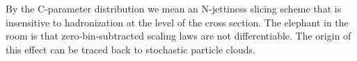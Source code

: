 By the C-parameter distribution we mean an N-jettiness slicing scheme
that is insensitive to hadronization at the level of the cross section.
The elephant in the room is that zero-bin-subtracted scaling laws are
not differentiable. The origin of this effect can be traced back to
stochastic particle clouds.

